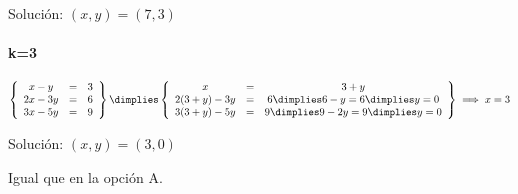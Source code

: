 \documentclass[palatino,nosec,nochap,nobuilddate]{Docencia}
\begin{document}
\begin{problem}[1]
Solución: $(x,y) = (7,3)$


\paragraph{k=3}
\[
\left\{\begin{array}{ccc}
x-y&=&3\\
2x-3y&=& 6\\
3x-5y&=&9
\end{array}\right\} \dimplies 
\left\{\begin{array}{ccc}
x&=&3+y\\
2(3+y)-3y&=& 6 \dimplies 6-y=6 \dimplies y=0\\
3(3+y)-5y&=&9 \dimplies 9-2y=9 \dimplies y=0
\end{array}\right\} \implies x=3
\]

Solución: $(x,y) = (3,0)$

\end{problem}

\begin{problem}[2]
Igual que en la opción A.
\solution
\end{problem}
\end{document}
